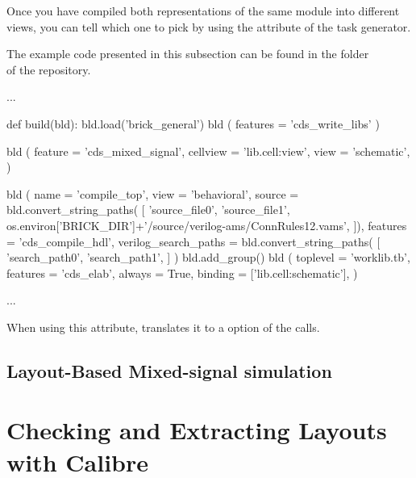 Once you have compiled both representations of the same module into different
views, you can tell  which one to pick by using the 
attribute of the task generator.

The example code presented in this subsection can be found in the folder\\
 of the repository.

\begin{lstwscript}
...

def build(bld):
    bld.load('brick_general')
    bld ( features = 'cds_write_libs' )

    bld (
        feature = 'cds_mixed_signal',
        cellview = 'lib.cell:view',
        view = 'schematic',
    )

    bld (
        name = 'compile_top',
        view = 'behavioral',
        source = bld.convert_string_paths(
            [
                'source_file0',
                'source_file1',
                os.environ['BRICK_DIR']+'/source/verilog-ams/ConnRules12.vams',
            ]),
        features = 'cds_compile_hdl',
        verilog_search_paths = bld.convert_string_paths(
            [
                'search_path0',
                'search_path1',
            ]
    )
    bld.add_group()
    bld (
        toplevel = 'worklib.tb',
        features = 'cds_elab',
        always = True,
        binding = ['lib.cell:schematic'],
    )

...
\end{lstwscript}

When using this attribute,  translates it to a  option of
the  calls.

\subsection{Layout-Based Mixed-signal simulation}

%
%
%
%
%
%

\section{Checking and Extracting Layouts with Calibre}

